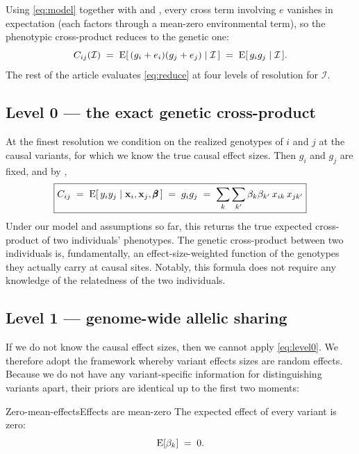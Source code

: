 \documentclass[12pt]{article}
\begin{document}
Using \eqref{eq:model} together with  and , every cross term involving $e$ vanishes in expectation (each factors through a mean-zero environmental term), so the phenotypic cross-product reduces to the genetic one:
\begin{equation}\label{eq:reduce}
    C_{ij}(\mathcal{I}) \;=\; \mathrm{E}[\,(g_i+e_i)(g_j+e_j) \mid \mathcal{I}\,] \;=\; \mathrm{E}[\,g_i g_j \mid \mathcal{I}\,] .
\end{equation}
The rest of the article evaluates \eqref{eq:reduce} at four levels of resolution for $\mathcal{I}$.

\subsection{Level 0 --- the exact genetic cross-product}
At the finest resolution we condition on the realized genotypes of $i$ and $j$ at the causal variants, for which we know the true causal effect sizes.
Then $g_i$ and $g_j$ are fixed, and by ,
\begin{equation}\label{eq:level0}
    \boxed{ C_{ij} \;=\; \mathrm{E}[\, y_i y_j \mid \mathbf{x}_i, \mathbf{x}_j, \pmb{\beta} \,] \;=\; g_i g_j \;=\; \sum_{k}\sum_{k'} \beta_k \beta_{k'}\, x_{ik}\, x_{jk'} }
\end{equation}
Under our model and assumptions so far, this returns the true expected cross-product of two individuals' phenotypes.
The genetic cross-product between two individuals is, fundamentally, an effect-size-weighted function of the genotypes they actually carry at causal sites.
Notably, this formula does not require any knowledge of the relatedness of the two individuals.

\subsection{Level 1 --- genome-wide allelic sharing}\label{sec:level1}
If we do not know the causal effect sizes, then we cannot apply \eqref{eq:level0}.
We therefore adopt the framework whereby variant effects sizes are random effects.
Because we do not have any variant-specific information for distinguishing variants apart, their priors are identical up to the first two moments:

\begin{assumption}{Zero-mean-effects}{Effects are mean-zero}
The expected effect of every variant is zero:
$$ \mathrm{E}[\beta_k] \;=\; 0 . $$
\end{assumption}
\end{document}
